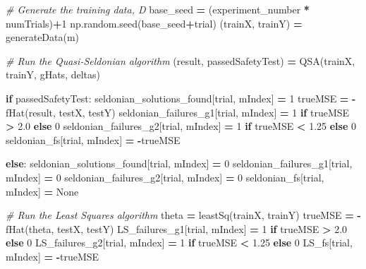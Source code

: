 \documentclass[12pt, twoside]{amherstthesis}
\newenvironment{Shaded}{\begin{snugshade}}{\end{snugshade}}
\newcommand{\CommentTok}[1]{\textcolor[rgb]{0.56,0.35,0.01}{\textit{#1}}}
\newcommand{\ControlFlowTok}[1]{\textcolor[rgb]{0.13,0.29,0.53}{\textbf{#1}}}
\newcommand{\DecValTok}[1]{\textcolor[rgb]{0.00,0.00,0.81}{#1}}
\newcommand{\FloatTok}[1]{\textcolor[rgb]{0.00,0.00,0.81}{#1}}
\newcommand{\NormalTok}[1]{#1}
\newcommand{\OperatorTok}[1]{\textcolor[rgb]{0.81,0.36,0.00}{\textbf{#1}}}
\newcommand{\VariableTok}[1]{\textcolor[rgb]{0.00,0.00,0.00}{#1}}
\begin{document}
\begin{Shaded}
\begin{Highlighting}[]
            \CommentTok{\# Generate the training data, D}
\NormalTok{            base\_seed         }\OperatorTok{=}\NormalTok{ (experiment\_number }\OperatorTok{*}\NormalTok{ numTrials)}\OperatorTok{+}\DecValTok{1}
\NormalTok{            np.random.seed(base\_seed}\OperatorTok{+}\NormalTok{trial) }
\NormalTok{            (trainX, trainY)  }\OperatorTok{=}\NormalTok{ generateData(m)}
            
            \CommentTok{\# Run the Quasi{-}Seldonian algorithm}
\NormalTok{            (result, passedSafetyTest) }\OperatorTok{=}\NormalTok{ QSA(trainX, trainY, gHats, deltas)}
            
            \ControlFlowTok{if}\NormalTok{ passedSafetyTest:}
\NormalTok{                seldonian\_solutions\_found[trial, mIndex] }\OperatorTok{=} \DecValTok{1}                        
\NormalTok{                trueMSE }\OperatorTok{=} \OperatorTok{{-}}\NormalTok{fHat(result, testX, testY)                               }
\NormalTok{                seldonian\_failures\_g1[trial, mIndex] }\OperatorTok{=} \DecValTok{1} \ControlFlowTok{if}\NormalTok{ trueMSE }\OperatorTok{\textgreater{}} \FloatTok{2.0}  \ControlFlowTok{else} \DecValTok{0}   
\NormalTok{                seldonian\_failures\_g2[trial, mIndex] }\OperatorTok{=} \DecValTok{1} \ControlFlowTok{if}\NormalTok{ trueMSE }\OperatorTok{\textless{}} \FloatTok{1.25} \ControlFlowTok{else} \DecValTok{0}   
\NormalTok{                seldonian\_fs[trial, mIndex] }\OperatorTok{=} \OperatorTok{{-}}\NormalTok{trueMSE                              }
                
            \ControlFlowTok{else}\NormalTok{:}
\NormalTok{                seldonian\_solutions\_found[trial, mIndex] }\OperatorTok{=} \DecValTok{0}             
\NormalTok{                seldonian\_failures\_g1[trial, mIndex]     }\OperatorTok{=} \DecValTok{0}             
\NormalTok{                seldonian\_failures\_g2[trial, mIndex]     }\OperatorTok{=} \DecValTok{0}            
\NormalTok{                seldonian\_fs[trial, mIndex]              }\OperatorTok{=} \VariableTok{None}          

            \CommentTok{\# Run the Least Squares algorithm}
\NormalTok{            theta }\OperatorTok{=}\NormalTok{ leastSq(trainX, trainY)                              }
\NormalTok{            trueMSE }\OperatorTok{=} \OperatorTok{{-}}\NormalTok{fHat(theta, testX, testY)                         }
\NormalTok{            LS\_failures\_g1[trial, mIndex] }\OperatorTok{=} \DecValTok{1} \ControlFlowTok{if}\NormalTok{ trueMSE }\OperatorTok{\textgreater{}} \FloatTok{2.0}  \ControlFlowTok{else} \DecValTok{0}   
\NormalTok{            LS\_failures\_g2[trial, mIndex] }\OperatorTok{=} \DecValTok{1} \ControlFlowTok{if}\NormalTok{ trueMSE }\OperatorTok{\textless{}} \FloatTok{1.25} \ControlFlowTok{else} \DecValTok{0}   
\NormalTok{            LS\_fs[trial, mIndex] }\OperatorTok{=} \OperatorTok{{-}}\NormalTok{trueMSE                             }
        

\end{Highlighting}
\end{Shaded}
\end{document}
